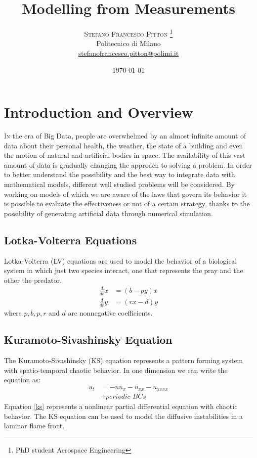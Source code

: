 \documentclass[]{article}
\title{Modelling from Measurements} %
\author{%
\textsc{Stefano Francesco Pitton
\thanks{PhD student Aerospace Engineering}} \\[1ex] %
\normalsize Politecnico di Milano \\ %
\normalsize \href{stefanofrancesco.pitton@polimi.it}{stefanofrancesco.pitton@polimi.it} %
}
\date{\today} %
\begin{document}
\maketitle


\section{Introduction and Overview}

\lettrine[nindent=0em,lines=3]{I}n the era of Big Data, people are overwhelmed by an almost infinite amount of data about their personal health, the weather, the state of a building and even the motion of natural and artificial bodies in space. The availability of this vast amount of data is gradually changing the approach to solving a problem. In order to better understand the possibility and the best way to integrate data with mathematical models, different well studied problems will be considered. By working on models of which we are aware of the laws that govern its behavior it is possible to evaluate the effectiveness or not of a certain strategy, thanks to the possibility of generating artificial data through numerical simulation. 
\subsection{Lotka-Volterra Equations}
Lotka-Volterra (LV) equations are used to model the behavior of a biological system in which just two species interact, one that represents the pray and the other the predator.
\begin{equation}
\begin{aligned}
\frac{d}{dt}x &= (b - py) x \\
\frac{d}{dt}y &= (rx - d) y
\end{aligned}
\end{equation}
where $p, b, p, r$ and $d$ are nonnegative coefficients.

\subsection{Kuramoto-Sivashinsky Equation}
The Kuramoto-Sivashinsky (KS) equation represents a pattern forming system with spatio-temporal chaotic behavior. In one dimension we can write the equation as:
\begin{equation}\label{ks}
\begin{aligned}
u_t &= -uu_x - u_{xx} - u_{xxxx}  \\
&+ \textit{periodic BCs}
\end{aligned}
\end{equation}
Equation \eqref{ks} represents a nonlinear partial differential equation with chaotic  behavior. The KS equation can be used to model the diffusive instabilities in a laminar flame front.
\end{document}
